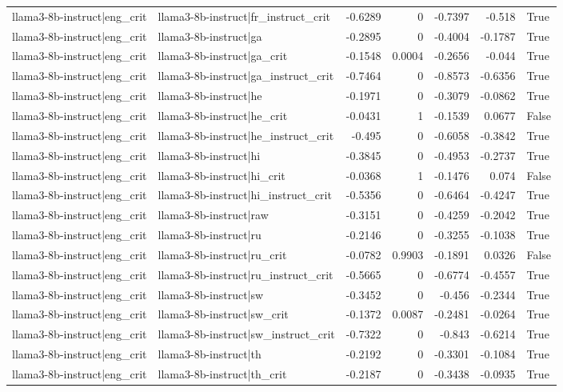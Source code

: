 \begin{table}
\begin{tabular}{l l r r r r l}
llama3-8b-instruct|eng_crit & llama3-8b-instruct|fr_instruct_crit & -0.6289 & 0 & -0.7397 & -0.518 & True \\
llama3-8b-instruct|eng_crit & llama3-8b-instruct|ga & -0.2895 & 0 & -0.4004 & -0.1787 & True \\
llama3-8b-instruct|eng_crit & llama3-8b-instruct|ga_crit & -0.1548 & 0.0004 & -0.2656 & -0.044 & True \\
llama3-8b-instruct|eng_crit & llama3-8b-instruct|ga_instruct_crit & -0.7464 & 0 & -0.8573 & -0.6356 & True \\
llama3-8b-instruct|eng_crit & llama3-8b-instruct|he & -0.1971 & 0 & -0.3079 & -0.0862 & True \\
llama3-8b-instruct|eng_crit & llama3-8b-instruct|he_crit & -0.0431 & 1 & -0.1539 & 0.0677 & False \\
llama3-8b-instruct|eng_crit & llama3-8b-instruct|he_instruct_crit & -0.495 & 0 & -0.6058 & -0.3842 & True \\
llama3-8b-instruct|eng_crit & llama3-8b-instruct|hi & -0.3845 & 0 & -0.4953 & -0.2737 & True \\
llama3-8b-instruct|eng_crit & llama3-8b-instruct|hi_crit & -0.0368 & 1 & -0.1476 & 0.074 & False \\
llama3-8b-instruct|eng_crit & llama3-8b-instruct|hi_instruct_crit & -0.5356 & 0 & -0.6464 & -0.4247 & True \\
llama3-8b-instruct|eng_crit & llama3-8b-instruct|raw & -0.3151 & 0 & -0.4259 & -0.2042 & True \\
llama3-8b-instruct|eng_crit & llama3-8b-instruct|ru & -0.2146 & 0 & -0.3255 & -0.1038 & True \\
llama3-8b-instruct|eng_crit & llama3-8b-instruct|ru_crit & -0.0782 & 0.9903 & -0.1891 & 0.0326 & False \\
llama3-8b-instruct|eng_crit & llama3-8b-instruct|ru_instruct_crit & -0.5665 & 0 & -0.6774 & -0.4557 & True \\
llama3-8b-instruct|eng_crit & llama3-8b-instruct|sw & -0.3452 & 0 & -0.456 & -0.2344 & True \\
llama3-8b-instruct|eng_crit & llama3-8b-instruct|sw_crit & -0.1372 & 0.0087 & -0.2481 & -0.0264 & True \\
llama3-8b-instruct|eng_crit & llama3-8b-instruct|sw_instruct_crit & -0.7322 & 0 & -0.843 & -0.6214 & True \\
llama3-8b-instruct|eng_crit & llama3-8b-instruct|th & -0.2192 & 0 & -0.3301 & -0.1084 & True \\
llama3-8b-instruct|eng_crit & llama3-8b-instruct|th_crit & -0.2187 & 0 & -0.3438 & -0.0935 & True \\

\end{tabular}
\end{table}

